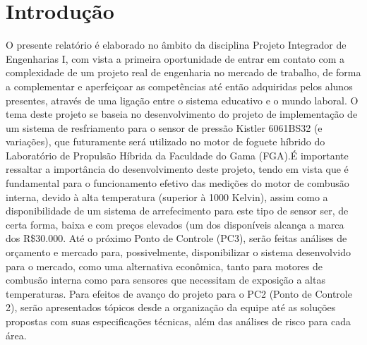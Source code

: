 \chapter{Introdução}
O presente relatório é elaborado no âmbito da disciplina Projeto Integrador de Engenharias I, com vista a primeira oportunidade de entrar em contato com a complexidade de um projeto real de engenharia no mercado de trabalho, de forma a complementar e aperfeiçoar as competências até então adquiridas pelos alunos presentes, através de uma ligação entre o sistema educativo e o mundo laboral. O tema deste projeto se baseia no desenvolvimento do projeto de implementação de um sistema de resfriamento para o sensor de pressão Kistler 6061BS32 (e variações), que futuramente será utilizado no motor de foguete híbrido do Laboratório de Propulsão Híbrida da Faculdade do Gama (FGA).É importante ressaltar a importância do desenvolvimento deste projeto, tendo em vista que é fundamental para o funcionamento efetivo das medições do motor de combusão interna, devido à alta temperatura (superior à 1000 Kelvin), assim como a disponibilidade de um sistema de arrefecimento para este tipo de sensor ser, de certa forma, baixa e com preços elevados (um dos disponíveis alcança a marca dos R\$30.000. Até o próximo Ponto de Controle (PC3), serão feitas análises de orçamento e mercado para, possivelmente, disponibilizar o sistema desenvolvido para o mercado, como uma alternativa econômica, tanto para motores de combusão interna como para sensores que necessitam de exposição a altas temperaturas. Para efeitos de avanço do projeto para o PC2 (Ponto de Controle 2), serão apresentados tópicos desde a organização da equipe até as soluções propostas com suas especificações técnicas, além das análises de risco para cada área.


